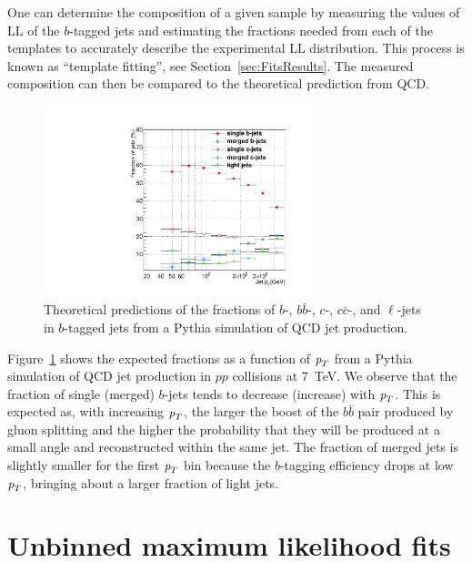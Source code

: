 One can determine the composition of a given sample by measuring the values of LL of the $b$-tagged jets and estimating the fractions needed from each of the templates to accurately describe the experimental LL distribution. This process is known as ``template fitting'', see Section~\ref{sec:FitsResults}. The measured composition can then be compared to the theoretical prediction from QCD. 
\begin{figure}[htb]
\centering
\includegraphics[width=0.70\textwidth]{TrueFractions_NominalPythia.pdf}
\caption{Theoretical predictions of the fractions of $b$-, $b\bar{b}$-, $c$-, $c\bar{c}$-, and $\ell$-jets in $b$-tagged jets from a {\sc Pythia} simulation of QCD jet production.}
\label{fig:truefractions}
\end{figure}
Figure~\ref{fig:truefractions} shows the expected fractions as a function of ${\emph{p}_{T}}$ from a {\sc Pythia} simulation of QCD jet production in $pp$ collisions at 7~TeV. We observe that the fraction of single (merged) $b$-jets tends to decrease (increase) with ${\emph{p}_{T}}$. This is expected as, with increasing ${\emph{p}_{T}}$, the larger the boost of the $b\bar{b}$ pair produced by gluon splitting and the higher the probability that they will be produced at a small angle and reconstructed within the same jet. The fraction of merged jets is slightly smaller for the first ${\emph{p}_{T}}$ bin because the $b$-tagging efficiency drops at low ${\emph{p}_{T}}$, bringing about a larger fraction of light jets. 


\section{Unbinned maximum likelihood fits}\label{sec:LLFits}

